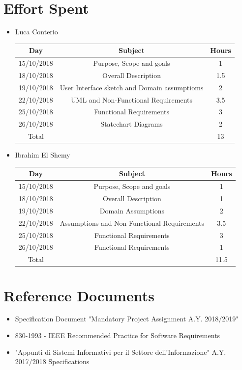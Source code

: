 \documentclass[12pt,a4paper]{article}
\begin{document}
	\section{Effort Spent}
	\begin{itemize}
		\item Luca Conterio
		\begin{center}
			\begin{tabular}{| c | c | c |}
				\hline
				Day & Subject & Hours \\ \hline
				15/10/2018 & Purpose, Scope and goals & 1 \\
				18/10/2018 & Overall Description & 1.5 \\
				19/10/2018  & User Interface sketch and Domain assumptioms & 2 \\
				22/10/2018  & UML and Non-Functional Requirements & 3.5 \\
				25/10/2018 & Functional Requirements & 3 \\
				26/10/2018 & Statechart Diagrams & 2 \\
				\hline
				Total & & 13\\
				\hline
			\end{tabular}
		\end{center}
		
		\item Ibrahim El Shemy
		\begin{center}
			\begin{tabular}{| c | c | c |}
				\hline
				Day & Subject & Hours \\ \hline
				15/10/2018 & Purpose, Scope and goals & 1 \\
				18/10/2018 & Overall Description & 1 \\
				19/10/2018  & Domain Assumptions & 2 \\
				22/10/2018  & Assumptions and Non-Functional Requirements & 3.5 \\
				25/10/2018 & Functional Requirements & 3 \\
				26/10/2018 & Functional Requirements & 1 \\
				\hline
				Total & & 11.5\\
				\hline
			\end{tabular}
		\end{center}
	\end{itemize}
	\section{Reference Documents}
	\begin{itemize}
		\item Specification Document "Mandatory Project Assignment A.Y. 2018/2019"
		\item 830-1993 - IEEE Recommended Practice for Software Requirements
		\item "Appunti di Sistemi Informativi per il Settore dell'Informazione" A.Y. 2017/2018
		Specifications
	\end{itemize}
\end{document}
